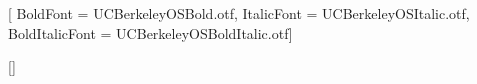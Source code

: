 \documentclass{report}
\begin{document}
%
%

\fancyhf{}

\small{}
\renewcommand{\headrulewidth}{0.4pt}

%
%


\usepackage{titlesec}
\usepackage{fontspec}


\newfontfamily{}[
BoldFont = UCBerkeleyOSBold.otf,
ItalicFont = UCBerkeleyOSItalic.otf,
BoldItalicFont = UCBerkeleyOSBoldItalic.otf]


\titleformat{\chapter}{\fontsize{30}{60}\headingfont}{\color{founderblue}\thechapter\fontsize{90}{60}}{10pt}{\thispagestyle{empty}\color{founderblue}\Huge\bfseries}


\titleformat{\section}{\Large\headingfont}{}{0pt}{\color{founderblue}{\thesection} \ }[{\titlerule[0.8pt]}]
\end{document}
